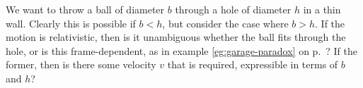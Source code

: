 We want to throw a ball of diameter $b$ through a hole of diameter $h$ in a thin wall.
Clearly this is possible if $b<h$, but consider the case where $b>h$.
If the motion is relativistic, then is it unambiguous whether the ball fits through the hole,
or is this frame-dependent, as in example \ref{eg:garage-paradox} on p.~\pageref{eg:garage-paradox}?
If the former, then is there some velocity $v$ that is required, expressible in terms of
$b$ and $h$?
